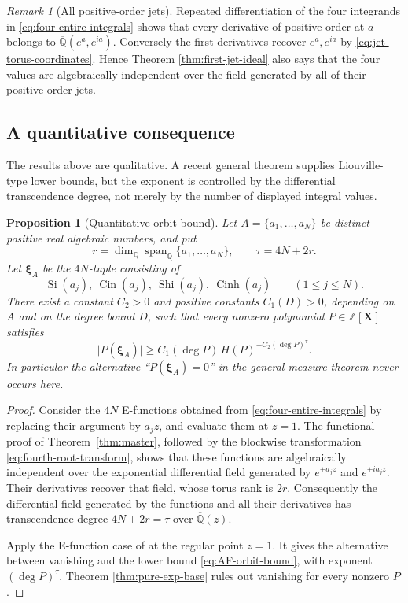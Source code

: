 \documentclass[11pt]{article}
\newtheorem{proposition}[theorem]{Proposition}
\theoremstyle{definition}
\theoremstyle{remark}
\newtheorem{remark}[theorem]{Remark}
\newcommand{\Q}{\mathbb Q}
\newcommand{\Qbar}{\overline{\mathbb Q}}
\newcommand{\Z}{\mathbb Z}
\newcommand{\Cin}{\operatorname{Cin}}
\newcommand{\Span}{\operatorname{span}}
\newcommand{\Si}{\operatorname{Si}}
\newcommand{\Shi}{\operatorname{Shi}}
\newcommand{\Cinh}{\operatorname{Cinh}}
\begin{document}
\begin{remark}[All positive-order jets]
Repeated differentiation of the four integrands in
\eqref{eq:four-entire-integrals} shows that every derivative of positive
order at \(a\) belongs to \(\Qbar(e^a,e^{ia})\).  Conversely the first
derivatives recover \(e^a,e^{ia}\) by
\eqref{eq:jet-torus-coordinates}.  Hence Theorem
\ref{thm:first-jet-ideal} also says that the four values are algebraically
independent over the field generated by all of their positive-order jets.
\end{remark}

\subsection{A quantitative consequence}

The results above are qualitative.  A recent general theorem supplies
Liouville-type lower bounds, but the exponent is controlled by the
differential transcendence degree, not merely by the number of displayed
integral values.

\begin{proposition}[Quantitative orbit bound]\label{prop:AF-orbit-measure}
Let \(A=\{a_1,\ldots,a_N\}\) be distinct positive real algebraic numbers,
and put
\[
 r=\dim_{\Q}\Span_{\Q}\{a_1,\ldots,a_N\},\qquad
 \tau=4N+2r.
\]
Let \(\boldsymbol\xi_A\) be the \(4N\)-tuple consisting of
\[
 \Si(a_j),\ \Cin(a_j),\ \Shi(a_j),\ \Cinh(a_j)
 \qquad(1\le j\le N).
\]
There exist a constant \(C_2>0\) and positive constants \(C_1(D)>0\),
depending on \(A\) and on the degree bound \(D\), such that every nonzero
polynomial \(P\in\Z[\mathbf X]\) satisfies
\begin{equation}\label{eq:AF-orbit-bound}
 \bigl|P(\boldsymbol\xi_A)\bigr|
 \ge C_1(\deg P)\,
       H(P)^{-C_2(\deg P)^{\tau}}.
\end{equation}
In particular the alternative ``\(P(\boldsymbol\xi_A)=0\)'' in the general
measure theorem never occurs here.
\end{proposition}

\begin{proof}
Consider the \(4N\) E-functions obtained from
\eqref{eq:four-entire-integrals} by replacing their argument by \(a_jz\),
and evaluate them at \(z=1\).  The functional proof of
Theorem~\ref{thm:master}, followed by the blockwise transformation
\eqref{eq:fourth-root-transform}, shows that these functions are
algebraically independent over the exponential differential field generated
by \(e^{\pm a_jz}\) and \(e^{\pm ia_jz}\).  Their derivatives recover that
field, whose torus rank is \(2r\).  Consequently the differential field
generated by the functions and all their derivatives has transcendence
degree \(4N+2r=\tau\) over \(\Qbar(z)\).

Apply the E-function case of
\cite[Theorem~1.3]{AdamczewskiFaverjon2025} at the regular point \(z=1\).
It gives the alternative between vanishing and the lower bound
\eqref{eq:AF-orbit-bound}, with exponent \((\deg P)^\tau\).  Theorem
\ref{thm:pure-exp-base} rules out vanishing for every nonzero \(P\).
\end{proof}
\end{document}
